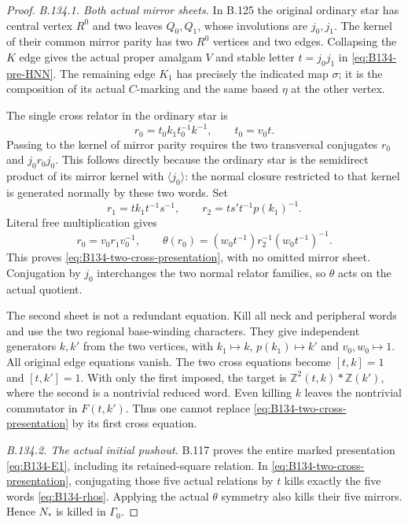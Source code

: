 \begin{proof}
\emph{B.134.1. Both actual mirror sheets.}
In B.125 the original ordinary star has central vertex $R^0$
and two leaves $Q_0,Q_1$, whose involutions are $j_0,j_1$.
The kernel of their common mirror parity has two $R^0$ vertices
and two edges. Collapsing the $K$ edge gives the actual proper
amalgam $V$ and stable letter $t=j_0j_1$ in
\eqref{eq:B134-pre-HNN}. The remaining edge $K_1$ has precisely
the indicated map $\sigma$; it is the composition of its actual
$C$-marking and the same based $\eta$ at the other vertex.

The single cross relator in the ordinary star is
\[
 r_0=t_0k_1t_0^{-1}k^{-1},\qquad t_0=v_0t.
\]
Passing to the kernel of mirror parity requires the two
transversal conjugates $r_0$ and $j_0r_0j_0$.
This follows directly because the ordinary star is the
semidirect product of its mirror kernel with $\langle j_0\rangle$:
the normal closure restricted to that kernel is generated normally
by these two words. Set
\[
 r_1=tk_1t^{-1}s^{-1},\qquad
 r_2=ts't^{-1}p(k_1)^{-1}.
\]
Literal free multiplication gives
\begin{equation}\label{eq:B134-two-sheet-identities}
 r_0=v_0r_1v_0^{-1},\qquad
 \theta(r_0)=(w_0t^{-1})r_2^{-1}(w_0t^{-1})^{-1}.
\end{equation}
This proves \eqref{eq:B134-two-cross-presentation}, with no
omitted mirror sheet. Conjugation by $j_0$ interchanges the two
normal relator families, so $\theta$ acts on the actual quotient.

The second sheet is not a redundant equation. Kill all neck and
peripheral words and use the two regional base-winding characters.
They give independent generators $k,k'$ from the two vertices,
with $k_1\mapsto k$, $p(k_1)\mapsto k'$ and $v_0,w_0\mapsto1$.
All original edge equations vanish. The two cross equations become
$[t,k]=1$ and $[t,k']=1$. With only the first imposed, the target
is $\mathbb Z^2(t,k)*\mathbb Z(k')$, where the second is a
nontrivial reduced word. Even killing $k$ leaves the nontrivial
commutator in $F(t,k')$. Thus one cannot replace
\eqref{eq:B134-two-cross-presentation} by its first cross equation.

\emph{B.134.2. The actual initial pushout.}
B.117 proves the entire marked presentation
\eqref{eq:B134-E1}, including its retained-square relation.
In \eqref{eq:B134-two-cross-presentation}, conjugating those
five actual relations by $t$ kills exactly the five words
\eqref{eq:B134-rhos}. Applying the actual $\theta$ symmetry
also kills their five mirrors. Hence $N_*$ is killed in
$\Gamma_0$.


\end{proof}
